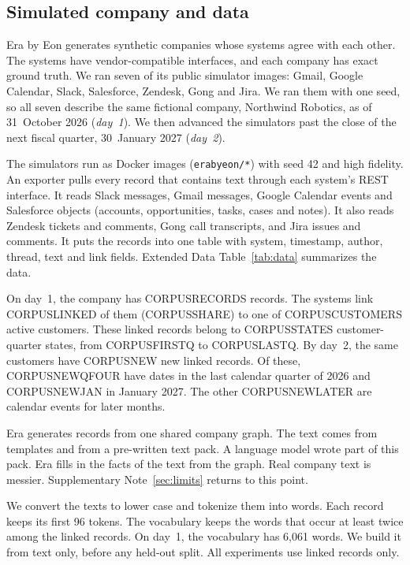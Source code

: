 \documentclass[11pt]{article}
\begin{document}
\subsection{Simulated company and data}
Era by Eon generates synthetic companies whose systems agree with each other. The systems have vendor-compatible interfaces, and each company has exact ground truth\citep{eon2026era,gruenbaum2026era}. We ran seven of its public simulator images: Gmail, Google Calendar, Slack, Salesforce, Zendesk, Gong and Jira. We ran them with one seed, so all seven describe the same fictional company, Northwind Robotics, as of 31~October 2026 (\emph{day~1}). We then advanced the simulators past the close of the next fiscal quarter, 30~January 2027 (\emph{day~2}).

The simulators run as Docker images (\texttt{erabyeon/*}) with seed 42 and high fidelity. An exporter pulls every record that contains text through each system's REST interface. It reads Slack messages, Gmail messages, Google Calendar events and Salesforce objects (accounts, opportunities, tasks, cases and notes). It also reads Zendesk tickets and comments, Gong call transcripts, and Jira issues and comments. It puts the records into one table with system, timestamp, author, thread, text and link fields. Extended Data Table~\ref{tab:data} summarizes the data.

On day~1, the company has CORPUSRECORDS records. The systems link CORPUSLINKED of them (CORPUSSHARE) to one of CORPUSCUSTOMERS active customers. These linked records belong to CORPUSSTATES customer-quarter states, from CORPUSFIRSTQ to CORPUSLASTQ. By day~2, the same customers have CORPUSNEW new linked records. Of these, CORPUSNEWQFOUR have dates in the last calendar quarter of 2026 and CORPUSNEWJAN in January 2027. The other CORPUSNEWLATER are calendar events for later months.

Era generates records from one shared company graph. The text comes from templates and from a pre-written text pack. A language model wrote part of this pack. Era fills in the facts of the text from the graph\citep{eon2026era}. Real company text is messier. Supplementary Note~\ref{sec:limits} returns to this point.

We convert the texts to lower case and tokenize them into words. Each record keeps its first 96 tokens. The vocabulary keeps the words that occur at least twice among the linked records. On day~1, the vocabulary has 6{,}061 words. We build it from text only, before any held-out split. All experiments use linked records only.
\end{document}
